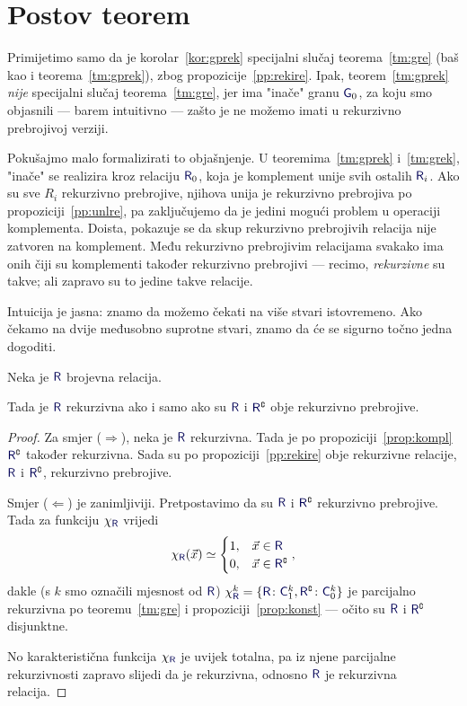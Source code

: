 \section{Postov teorem}\label{sec:Post}

Primijetimo samo da je korolar~\ref{kor:gprek} specijalni slučaj teorema~\ref{tm:gre} (baš kao i teorema~\ref{tm:gprek}), zbog propozicije~\ref{pp:rekire}. Ipak, teorem~\ref{tm:gprek} \emph{nije} specijalni slučaj teorema~\ref{tm:gre}, jer ima "inače" granu $\f G_0$, za koju smo objasnili --- barem intuitivno --- zašto je ne možemo imati u rekurzivno prebrojivoj verziji.

Pokušajmo malo formalizirati to objašnjenje. U teoremima~\ref{tm:gprek} i~\ref{tm:grek}, "inače" se realizira kroz relaciju $\f R_0$, koja je komplement unije svih ostalih $\f R_i$. Ako su sve $R_i$ rekurzivno prebrojive, njihova unija je rekurzivno prebrojiva po propoziciji~\ref{pp:unlre}, pa zaključujemo da je jedini mogući problem u operaciji komplementa. Doista, pokazuje se da skup rekurzivno prebrojivih relacija nije zatvoren na komplement. Među rekurzivno prebrojivim relacijama svakako ima onih čiji su komplementi također rekurzivno prebrojivi --- recimo, \emph{rekurzivne} su takve; ali zapravo su to jedine takve relacije.

Intuicija je jasna: znamo da možemo čekati na više stvari istovremeno. Ako čekamo na dvije međusobno suprotne stvari, znamo da će se sigurno točno jedna dogoditi.

\begin{teorem}[Post]\label{tm:Post}
Neka je $\f R$ brojevna relacija.
    
    Tada je $\f R$ rekurzivna ako i samo ako su $\f R$ i $\f R\kompl$ obje rekurzivno prebrojive.
\end{teorem}
\begin{proof}
Za smjer ($\Rightarrow$), neka je $\f R$ rekurzivna. Tada je po propoziciji~\ref{prop:kompl} $\f R\kompl$ također rekurzivna. Sada su po propoziciji~\ref{pp:rekire} obje rekurzivne relacije, $\f R$ i $\f R\kompl$, rekurzivno prebrojive.

Smjer ($\Leftarrow$) je zanimljiviji. Pretpostavimo da su $\f R$ i $\f R\kompl$ rekurzivno prebrojive. Tada za funkciju $\chi_{\f R}$ vrijedi
\begin{equation}
    \chi_{\f R}(\vec x)\simeq\begin{cases}
    1,&\vec x\in\f R\\
    0,&\vec x\in\f R\kompl
    \end{cases}\text,
\end{equation}
dakle (s $k$ smo označili mjesnost od $\f R$) $\chi^k_{\f R}=\{\f R\colon\f C_1^k,\f R\kompl\colon\f C_0^k\}$ je parcijalno rekurzivna po teoremu~\ref{tm:gre} i propoziciji~\ref{prop:konst} --- očito su $\f R$ i $\f R\kompl$ disjunktne.

No karakteristična funkcija $\chi_{\f R}$ je uvijek totalna, pa iz njene parcijalne rekurzivnosti zapravo slijedi da je rekurzivna, odnosno $\f R$ je rekurzivna relacija.
\end{proof}

